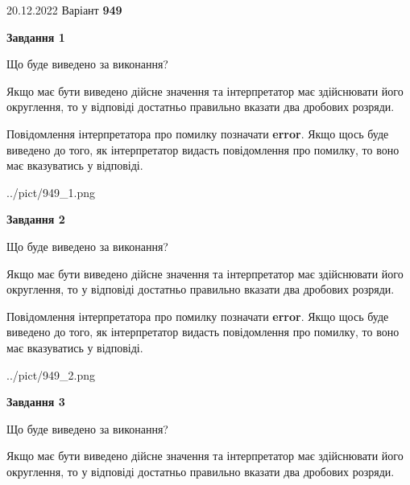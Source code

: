 \documentclass[12pt, ukrainian]{article}
\begin{document}
{20.12.2022 Варіант \No \textbf { 949 }\par}
{
\begin {Large}

{\begin {center}\textbf{Завдання 1}\end {center}}\par
Що буде виведено за виконання? \par

Якщо має бути виведено дійсне значення та інтерпретатор має здійснювати його округлення, 
то у відповіді достатньо правильно вказати два дробових розряди.

Повідомлення інтерпретатора про помилку позначати \textbf{error}.
Якщо щось буде виведено до того, як інтерпретатор видасть повідомлення про помилку, 
то воно має вказуватись у відповіді. \par

\begin{center}
	{../pict/949_1.png}
\end{center}
\newpage

{\begin {center}\textbf{Завдання 2}\end {center}}\par
Що буде виведено за виконання? \par

Якщо має бути виведено дійсне значення та інтерпретатор має здійснювати його округлення, 
то у відповіді достатньо правильно вказати два дробових розряди.

Повідомлення інтерпретатора про помилку позначати \textbf{error}.
Якщо щось буде виведено до того, як інтерпретатор видасть повідомлення про помилку, 
то воно має вказуватись у відповіді. \par

\begin{center}
	{../pict/949_2.png}
\end{center}
\newpage

{\begin {center}\textbf{Завдання 3}\end {center}}\par
Що буде виведено за виконання? \par

Якщо має бути виведено дійсне значення та інтерпретатор має здійснювати його округлення, 
то у відповіді достатньо правильно вказати два дробових розряди.


\end{Large}}
\end{document}
